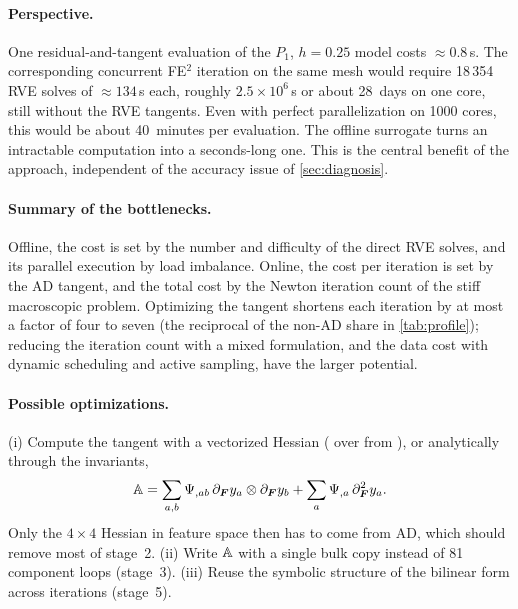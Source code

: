 \paragraph{Perspective.} One residual-and-tangent evaluation of the $P_1$, $h=0.25$
model costs $\approx0.8\,$s. The corresponding concurrent FE$^2$ iteration on the same mesh would require
18\,354 RVE solves of $\approx134\,$s each, roughly $2.5\times10^6\,$s or about
28~days on one core, still without the RVE tangents. Even with perfect
parallelization on 1000 cores, this would be about 40~minutes per evaluation. The
offline surrogate turns an intractable computation into a seconds-long one. This
is the central benefit of the approach, independent of the accuracy issue of
\cref{sec:diagnosis}.

\paragraph{Summary of the bottlenecks.} Offline, the cost is set by the number
and difficulty of the direct RVE solves, and its parallel execution by load
imbalance. Online, the cost per iteration is set by the AD tangent, and the total
cost by the Newton iteration count of the stiff macroscopic problem. Optimizing
the tangent shortens each iteration by at most a factor of four to seven (the
reciprocal of the non-AD share in \cref{tab:profile}); reducing the
iteration count with a mixed formulation, and the data cost with dynamic
scheduling and active sampling, have the larger potential.

\paragraph{Possible optimizations.} (i) Compute the tangent with a vectorized
Hessian ( over  from ), or analytically through the
invariants,
\[\mathbb A=\sum_{a,b}\Psi_{,ab}\,\partial_{\bm F}y_a\otimes\partial_{\bm F}y_b
+\sum_a\Psi_{,a}\,\partial^2_{\bm F}y_a .\]
Only the $4\times4$ Hessian in feature space
then has to come from AD, which should remove most of stage~2. (ii) Write $\mathbb A$
with a single bulk copy instead of 81 component loops (stage~3). (iii) Reuse the
symbolic structure of the bilinear form across iterations (stage~5).
